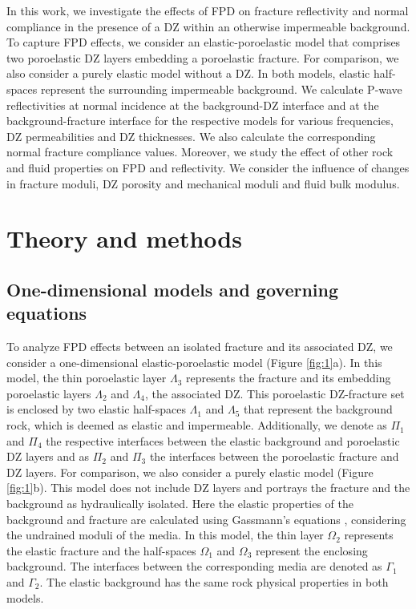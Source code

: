 \documentclass[draft]{agujournal2019}
\begin{document}
In this work, we investigate the effects of FPD on fracture reflectivity  and normal compliance in the  presence of a DZ within an otherwise impermeable background.
To capture FPD effects, we consider an elastic-poroelastic model that comprises two poroelastic DZ layers embedding a poroelastic fracture. For comparison, we also consider a purely elastic model without a DZ. In both models, elastic half-spaces represent the surrounding impermeable background.
We calculate P-wave reflectivities at normal incidence at the background-DZ interface and at the background-fracture interface for the respective models for various frequencies, DZ permeabilities and DZ thicknesses. We also calculate the corresponding normal fracture compliance values. Moreover, we study the effect of other rock and fluid properties on FPD and reflectivity. We consider 
the influence of changes in fracture moduli, DZ porosity and mechanical moduli and fluid bulk modulus. 

\section{Theory and methods}
\subsection{One-dimensional models and governing equations}
\begin{sloppypar}
To analyze FPD effects between an isolated fracture and its associated DZ, we consider a one-dimensional elastic-poro\-elastic model (Figure \ref{fig:1}a). In this model, the thin poro\-elastic layer $\Lambda_3$ represents the fracture and its embedding poro\-elastic layers $\Lambda_2$ and $\Lambda_4$, the associated DZ. This poroelastic DZ-fracture set is enclosed by two elastic half-spaces $\Lambda_1$ and $\Lambda_5$ that represent the  background rock, which is deemed as elastic and impermeable.
Additionally, we denote as $\Pi_1$ and $\Pi_4$ the respective interfaces between the elastic background and poro\-elastic DZ layers and as $\Pi_2$ and $\Pi_3$ the interfaces between the poro\-elastic fracture and DZ layers. 
For comparison, we also consider a purely elastic model (Figure \ref{fig:1}b). This model does not include DZ layers and portrays the fracture and the background as hydraulically isolated. Here the elastic properties of the background and fracture are calculated using Gassmann's equations \cite{Gassmann1951}, considering the undrained moduli of the media.
In this model, the thin layer $\Omega_2$ represents the elastic fracture and the half-spaces $\Omega_1$ and $\Omega_3$ represent the enclosing background. The interfaces between the corresponding media are denoted as $\Gamma_1$ and $\Gamma_2$. The elastic background has the same rock physical properties in both models.
\end{sloppypar}
\end{document}
